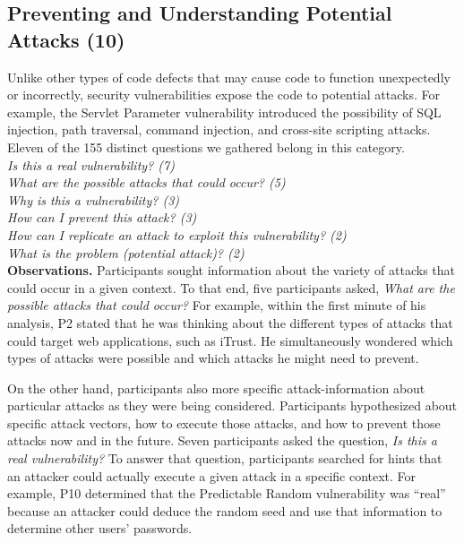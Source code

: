 \documentclass[conference]{IEEEtran}
\begin{document}




\noindent\subsection{\textbf{Preventing and Understanding Potential Attacks (10)}}\label{pupa}
Unlike other types of code defects that may cause code to function unexpectedly or incorrectly, security vulnerabilities expose the code to potential attacks. For example, the Servlet Parameter vulnerability introduced the possibility of SQL injection, path traversal, command injection, and cross-site scripting attacks.
Eleven of the 155 distinct questions we gathered belong in this category.
\\

\noindent\emph{Is this a real vulnerability? (7)} \\
\emph{What are the possible attacks that could occur? (5)} \\
\emph{Why is this a vulnerability? (3)} \\
\emph{How can I prevent this attack? (3)} \\
\emph{How can I replicate an attack to exploit this vulnerability? (2)} \\
\emph{What is the problem (potential attack)? (2)} \\

\noindent\textbf{Observations.}
Participants sought information about the variety of attacks that could occur in a given context.
To that end, five participants asked, \textit{What are the possible attacks that could occur?}
For example, within the first minute of his analysis, P2 stated that he was thinking about the different types of attacks that could target web applications, such as iTrust. He simultaneously wondered which types of attacks were possible and which attacks he might need to prevent.

On the other hand, participants also more specific attack-information about particular attacks as they were being considered.
Participants hypothesized about specific attack vectors, how to execute those attacks, and how to prevent those attacks now and in the future.
Seven participants asked the question, \textit{Is this a real vulnerability?} To answer that question, participants searched for hints that an attacker could actually execute a given attack in a specific context. For example, P10 determined that the Predictable Random vulnerability was ``real'' because an attacker could deduce the random seed and use that information to determine other users' passwords. 
\\
\end{document}
